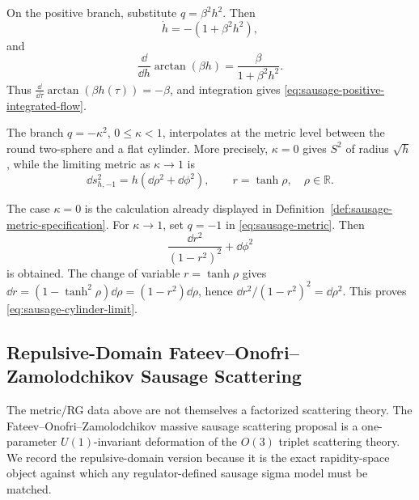 On the positive branch, substitute \(q=\beta^2h^2\).  Then
\[
  \dot h=-(1+\beta^2h^2),
\]
and
\[
  \frac{\dd}{\dd h}\arctan(\beta h)=\frac{\beta}{1+\beta^2h^2}.
\]
Thus \(\frac{\dd}{\dd\tau}\arctan(\beta h(\tau))=-\beta\), and integration
gives \eqref{eq:sausage-positive-integrated-flow}.

\begin{remark}
\label{rem:sausage-metric-endpoints}
The branch \(q=-\kappa^2\), \(0\le\kappa<1\), interpolates at the metric level
between the round two-sphere and a flat cylinder.  More precisely,
\(\kappa=0\) gives \(S^2\) of radius \(\sqrt h\), while the limiting metric
as \(\kappa\to1\) is
\begin{equation}
  \dd s^2_{h,-1}=h(\dd\rho^2+\dd\phi^2),
  \qquad r=\tanh\rho,\quad \rho\in\mathbb R .
  \label{eq:sausage-cylinder-limit}
\end{equation}
\end{remark}

The case \(\kappa=0\) is the calculation already displayed in
Definition~\ref{def:sausage-metric-specification}.  For \(\kappa\to1\), set
\(q=-1\) in \eqref{eq:sausage-metric}.  Then
\[
  \frac{\dd r^2}{(1-r^2)^2}
  +
  \dd\phi^2
\]
is obtained.  The change of variable \(r=\tanh\rho\) gives
\(\dd r=(1-\tanh^2\rho)\dd\rho=(1-r^2)\dd\rho\), hence
\(\dd r^2/(1-r^2)^2=\dd\rho^2\).  This proves
\eqref{eq:sausage-cylinder-limit}.

\subsection{Repulsive-Domain Fateev--Onofri--Zamolodchikov Sausage Scattering}
\label{sec:repulsive-sausage-scattering}

The metric/RG data above are not themselves a factorized scattering theory.
The Fateev--Onofri--Zamolodchikov massive sausage scattering proposal is a
one-parameter \(U(1)\)-invariant deformation of the \(O(3)\) triplet
scattering theory.  We record the repulsive-domain version because it is the
exact rapidity-space object against which any regulator-defined sausage sigma
model must be matched.


